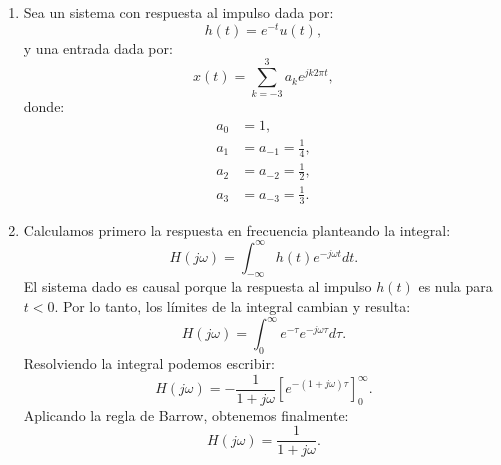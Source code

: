 \begin{enumerate}
	\item Sea un sistema con respuesta al impulso dada por:
	\begin{equation}
		h(t) = e^{-t} u(t),
	\end{equation}
	y una entrada dada por:
	\begin{equation}
		x(t) = \sum_{k=-3}^{3} a_{k} e^{jk2\pi t},
	\end{equation}
	donde:
	\begin{equation}
		\begin{aligned}
			a_{0} &= 1, \\
			a_{1} &= a_{-1} = \frac{1}{4}, \\
			a_{2} &= a_{-2} = \frac{1}{2}, \\
			a_{3} &= a_{-3} = \frac{1}{3}.
		\end{aligned}
	\end{equation}
	
	\item Calculamos primero la respuesta en frecuencia planteando la integral:
	\begin{equation}
		H(j\omega) = \int_{-\infty}^{\infty} h(t) e^{-j\omega t} dt.
	\end{equation}
	El sistema dado es causal porque la respuesta al impulso $h(t)$ es nula para $t < 0$. Por lo tanto, los l\'{i}mites de la integral cambian y resulta:
	\begin{equation}
		H(j\omega) = \int_{0}^{\infty} e^{-\tau} e^{-j\omega \tau} d\tau.
	\end{equation}
	Resolviendo la integral podemos escribir:
	\begin{equation}
		H(j\omega) = -\frac{1}{1+j\omega} \left[ e^{-(1+j\omega)\tau} \right]_{0}^{\infty}.
	\end{equation}
	Aplicando la regla de Barrow, obtenemos finalmente:
	\begin{equation}
		H(j\omega) = \frac{1}{1+j\omega}.
	\end{equation}
	

\end{enumerate}
